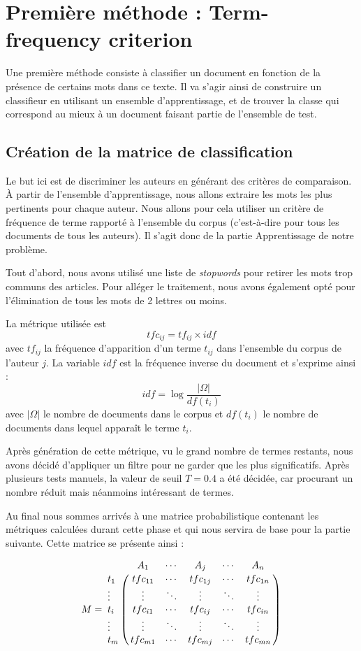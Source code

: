\documentclass[a4paper,12pt]{report}
\begin{document}
\section{Première méthode : Term-frequency criterion}
Une première méthode consiste à classifier un document en fonction de la présence de certains mots dans ce texte. Il va s'agir ainsi de construire un classifieur en utilisant un ensemble d'apprentissage, et de trouver la classe qui correspond au mieux à un document faisant partie de l'ensemble de test.

\subsection{Création de la matrice de classification}
Le but ici est de discriminer les auteurs en générant des critères de comparaison. À partir de l'ensemble d'apprentissage, nous allons extraire les mots les plus pertinents pour chaque auteur. Nous allons pour cela utiliser un critère de fréquence de terme rapporté à l'ensemble du corpus (c'est-à-dire pour tous les documents de tous les auteurs). Il s'agit donc de la partie Apprentissage de notre problème.

Tout d'abord, nous avons utilisé une liste de \textit{stopwords} pour retirer les mots trop communs des articles. Pour alléger le traitement, nous avons également opté pour l'élimination de tous les mots de 2 lettres ou moins. 

La métrique utilisée est \[ tfc_{ij} = tf_{ij} \times idf\] avec $tf_{ij}$ la fréquence d'apparition d'un terme $t_{ij}$ dans l'ensemble du corpus de l'auteur $j$. La variable $idf$ est la fréquence inverse du document et s'exprime ainsi : \[idf = \log \frac{|\Omega|}{df(t_{i})} \] avec $|\Omega|$ le nombre de documents dans le corpus et $df(t_{i})$ le nombre de documents dans lequel apparaît le terme $t_{i}$.

Après génération de cette métrique, vu le grand nombre de termes restants, nous avons décidé d'appliquer un filtre pour ne garder que les plus significatifs. Après plusieurs tests manuels, la valeur de seuil $T = 0.4 $ a été décidée, car procurant un nombre réduit mais néanmoins intéressant de termes.

Au final nous sommes arrivés à une matrice probabilistique contenant les métriques calculées durant cette phase et qui nous servira de base pour la partie suivante. Cette matrice se présente ainsi :

\[M=\bordermatrix{
&A_{1}&\cdots&A_{j}&\cdots&A_{n}\cr
t_{1}& tfc_{11} & \cdots & tfc_{1j} & \cdots & tfc_{1n} \cr
\vdots&\vdots&\ddots&\vdots&\ddots&\vdots\cr
t_{i}& tfc_{i1} & \cdots & tfc_{ij} & \cdots & tfc_{in} \cr
\vdots&\vdots&\ddots&\vdots&\ddots&\vdots\cr
t_{m}& tfc_{m1} & \cdots & tfc_{mj} & \cdots & tfc_{mn} \cr
}\]
\end{document}
